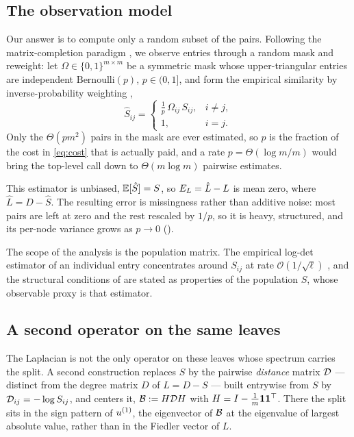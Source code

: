 \subsection{The observation model}\label{sec:problem-sampling}

Our answer is to compute only a random subset of the pairs. Following the
matrix-completion paradigm \cite{candes2009power, candes2008exact}, we observe
entries through a random mask and reweight: let $\Omega\in\{0,1\}^{m\times m}$ be a
symmetric mask whose upper-triangular entries are independent
$\mathrm{Bernoulli}(p)$, $p\in(0,1]$, and form the empirical similarity by
inverse-probability weighting \cite{candes2009matrix},
\begin{equation}\label{eq:sampling_estimator}
   \hat S_{ij}=\begin{cases}\tfrac1p\,\Omega_{ij}\,S_{ij}, & i\ne j,\\ 1, & i=j.\end{cases}
\end{equation}
Only the $\Theta(p m^2)$ pairs in the mask are ever estimated, so $p$ is the
fraction of the cost in \eqref{eq:cost} that is actually paid, and a rate
$p=\Theta(\log m/m)$ would bring the top-level call down to $\Theta(m\log m)$
pairwise estimates.

This estimator is unbiased, $\mathbb{E}[\hat S]=S$, so $E_{L}=\hat L-L$ is mean zero, where
$\hat L=\hat D-\hat S$. The resulting error is missingness rather than additive
noise: most pairs are left at zero and the rest rescaled by $1/p$, so it is heavy,
structured, and its per-node variance grows as $p\to0$ ().

The scope of the analysis is the population matrix. The empirical log-det estimator
of an individual entry concentrates around $S_{ij}$ at rate
$\mathcal O(1/\sqrt\ell)$ \cite{aizenbud2023spectral}, and the structural
conditions of  are stated as properties of the population $S$,
whose observable proxy is that estimator. 

\subsection{A second operator on the same leaves}\label{sec:problem-distance}

The Laplacian is not the only operator on these leaves whose spectrum carries the
split. A second construction replaces $S$ by the pairwise \emph{distance} matrix
$\mathcal{D}$ --- distinct from the degree matrix $D$ of $L=D-S$ --- built entrywise from
$S$ by $\mathcal{D}_{ij}=-\log S_{ij}$, and centers it, $\mathcal{B}:=H\mathcal{D} H$ with
$H=I-\tfrac1m\mathbf{1}\mathbf{1}^\top$. There the split sits in the sign pattern of $u^{(1)}$, the
eigenvector of $\mathcal{B}$ at the eigenvalue of largest absolute value, rather than in
the Fiedler vector of $L$.

